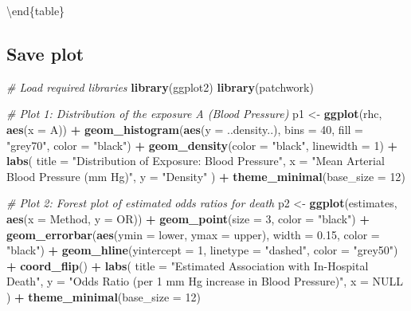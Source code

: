 \documentclass[
]{article}
\newenvironment{Shaded}{\begin{snugshade}}{\end{snugshade}}
\newcommand{\AttributeTok}[1]{\textcolor[rgb]{0.13,0.29,0.53}{#1}}
\newcommand{\CommentTok}[1]{\textcolor[rgb]{0.56,0.35,0.01}{\textit{#1}}}
\newcommand{\ConstantTok}[1]{\textcolor[rgb]{0.56,0.35,0.01}{#1}}
\newcommand{\DecValTok}[1]{\textcolor[rgb]{0.00,0.00,0.81}{#1}}
\newcommand{\FloatTok}[1]{\textcolor[rgb]{0.00,0.00,0.81}{#1}}
\newcommand{\FunctionTok}[1]{\textcolor[rgb]{0.13,0.29,0.53}{\textbf{#1}}}
\newcommand{\NormalTok}[1]{#1}
\newcommand{\OtherTok}[1]{\textcolor[rgb]{0.56,0.35,0.01}{#1}}
\newcommand{\SpecialCharTok}[1]{\textcolor[rgb]{0.81,0.36,0.00}{\textbf{#1}}}
\newcommand{\StringTok}[1]{\textcolor[rgb]{0.31,0.60,0.02}{#1}}
\begin{document}
\textbackslash end\{table\}

\subsection{Save plot}\label{save-plot}

\begin{Shaded}
\begin{Highlighting}[]
\CommentTok{\# Load required libraries}
\FunctionTok{library}\NormalTok{(ggplot2)}
\FunctionTok{library}\NormalTok{(patchwork)}

\CommentTok{\# Plot 1: Distribution of the exposure A (Blood Pressure)}
\NormalTok{p1 }\OtherTok{\textless{}{-}} \FunctionTok{ggplot}\NormalTok{(rhc, }\FunctionTok{aes}\NormalTok{(}\AttributeTok{x =}\NormalTok{ A)) }\SpecialCharTok{+}
  \FunctionTok{geom\_histogram}\NormalTok{(}\FunctionTok{aes}\NormalTok{(}\AttributeTok{y =}\NormalTok{ ..density..), }\AttributeTok{bins =} \DecValTok{40}\NormalTok{, }\AttributeTok{fill =} \StringTok{"grey70"}\NormalTok{, }\AttributeTok{color =} \StringTok{"black"}\NormalTok{) }\SpecialCharTok{+}
  \FunctionTok{geom\_density}\NormalTok{(}\AttributeTok{color =} \StringTok{"black"}\NormalTok{, }\AttributeTok{linewidth =} \DecValTok{1}\NormalTok{) }\SpecialCharTok{+}
  \FunctionTok{labs}\NormalTok{(}
    \AttributeTok{title =} \StringTok{"Distribution of Exposure: Blood Pressure"}\NormalTok{,}
    \AttributeTok{x =} \StringTok{"Mean Arterial Blood Pressure (mm Hg)"}\NormalTok{,}
    \AttributeTok{y =} \StringTok{"Density"}
\NormalTok{  ) }\SpecialCharTok{+}
  \FunctionTok{theme\_minimal}\NormalTok{(}\AttributeTok{base\_size =} \DecValTok{12}\NormalTok{)}

\CommentTok{\# Plot 2: Forest plot of estimated odds ratios for death}
\NormalTok{p2 }\OtherTok{\textless{}{-}} \FunctionTok{ggplot}\NormalTok{(estimates, }\FunctionTok{aes}\NormalTok{(}\AttributeTok{x =}\NormalTok{ Method, }\AttributeTok{y =}\NormalTok{ OR)) }\SpecialCharTok{+}
  \FunctionTok{geom\_point}\NormalTok{(}\AttributeTok{size =} \DecValTok{3}\NormalTok{, }\AttributeTok{color =} \StringTok{"black"}\NormalTok{) }\SpecialCharTok{+}
  \FunctionTok{geom\_errorbar}\NormalTok{(}\FunctionTok{aes}\NormalTok{(}\AttributeTok{ymin =}\NormalTok{ lower, }\AttributeTok{ymax =}\NormalTok{ upper), }\AttributeTok{width =} \FloatTok{0.15}\NormalTok{, }\AttributeTok{color =} \StringTok{"black"}\NormalTok{) }\SpecialCharTok{+}
  \FunctionTok{geom\_hline}\NormalTok{(}\AttributeTok{yintercept =} \DecValTok{1}\NormalTok{, }\AttributeTok{linetype =} \StringTok{"dashed"}\NormalTok{, }\AttributeTok{color =} \StringTok{"grey50"}\NormalTok{) }\SpecialCharTok{+}
  \FunctionTok{coord\_flip}\NormalTok{() }\SpecialCharTok{+}
  \FunctionTok{labs}\NormalTok{(}
    \AttributeTok{title =} \StringTok{"Estimated Association with In{-}Hospital Death"}\NormalTok{,}
    \AttributeTok{y =} \StringTok{"Odds Ratio (per 1 mm Hg increase in Blood Pressure)"}\NormalTok{,}
    \AttributeTok{x =} \ConstantTok{NULL}
\NormalTok{  ) }\SpecialCharTok{+}
  \FunctionTok{theme\_minimal}\NormalTok{(}\AttributeTok{base\_size =} \DecValTok{12}\NormalTok{)}


\end{Highlighting}
\end{Shaded}
\end{document}
